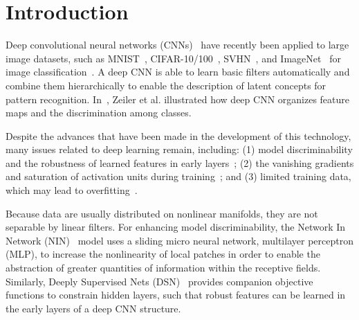 \documentclass[10pt,twocolumn,letterpaper]{article}
\begin{document}
\section{Introduction}
Deep convolutional neural networks (CNNs)~\cite{krizhevsky2012imagenet} have recently been applied to large image datasets, such as MNIST~\cite{lecun1998gradient}, CIFAR-10/100~\cite{krizhevsky2009learning}, SVHN~\cite{netzer2011reading}, and ImageNet~\cite{deng2009imagenet} for image classification~\cite{corr:hinton2012improving}. 
A deep CNN is able to learn basic filters automatically and combine them hierarchically to enable the description of latent concepts for pattern recognition.
In~\cite{zeiler2014visualizing}, Zeiler et al. illustrated how deep CNN organizes feature maps and the discrimination among classes. 

    Despite the advances that have been made in the development of this technology, many issues related to deep learning remain, including: (1) model discriminability and the robustness of learned features in early layers~\cite{zeiler2014visualizing}; (2) the vanishing gradients and saturation of activation units during training~\cite{glorot2010understanding}; and (3) limited training data, which may lead to overfitting~\cite{srivastava2014dropout}. 

	Because data are usually distributed on nonlinear manifolds, they are not separable by linear filters. For enhancing model discriminability, the Network In Network (NIN)~\cite{DBLP:journals/corr/LinCY13} model uses a sliding micro neural network, multilayer perceptron (MLP), to increase the nonlinearity of local patches in order to enable the abstraction of greater quantities of information within the receptive fields. Similarly, Deeply Supervised Nets (DSN)~\cite{lee2014deeply} provides companion objective functions to constrain hidden layers, such that robust features can be learned in the early layers of a deep CNN structure. 
\end{document}
